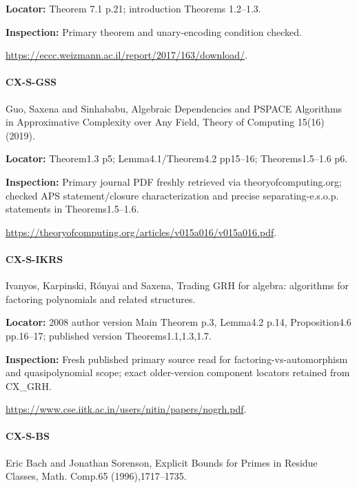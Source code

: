 \documentclass[11pt,a4paper]{article}
\begin{document}
\textbf{Locator:} Theorem 7.\allowbreak{}1 p.\allowbreak{}21; introduction Theorems 1.\allowbreak{}2–\allowbreak{}1.\allowbreak{}3.

\textbf{Inspection:} Primary theorem and unary-encoding condition checked.\allowbreak{}

\url{https://eccc.weizmann.ac.il/report/2017/163/download/}.

\paragraph{CX-S-GSS} Guo, Saxena and Sinhababu, Algebraic Dependencies and PSPACE Algorithms in Approximative Complexity over Any Field, Theory of Computing 15(16) (2019).

\textbf{Locator:} Theorem1.\allowbreak{}3 p5; Lemma4.\allowbreak{}1/\allowbreak{}Theorem4.\allowbreak{}2 pp15–\allowbreak{}16; Theorems1.\allowbreak{}5–\allowbreak{}1.\allowbreak{}6 p6.

\textbf{Inspection:} Primary journal PDF freshly retrieved via theoryofcomputing.\allowbreak{}org; checked APS statement/\allowbreak{}closure characterization and precise separating-e.\allowbreak{}s.\allowbreak{}o.\allowbreak{}p.\allowbreak{} statements in Theorems1.\allowbreak{}5–\allowbreak{}1.\allowbreak{}6.\allowbreak{}

\url{https://theoryofcomputing.org/articles/v015a016/v015a016.pdf}.

\paragraph{CX-S-IKRS} Ivanyos, Karpinski, Rónyai and Saxena, Trading GRH for algebra:\allowbreak{} algorithms for factoring polynomials and related structures.

\textbf{Locator:} 2008 author version Main Theorem p.\allowbreak{}3, Lemma4.\allowbreak{}2 p.\allowbreak{}14, Proposition4.\allowbreak{}6 pp.\allowbreak{}16–\allowbreak{}17; published version Theorems1.\allowbreak{}1,1.\allowbreak{}3,1.\allowbreak{}7.

\textbf{Inspection:} Fresh published primary source read for factoring-vs-automorphism and quasipolynomial scope; exact older-version component locators retained from CX\_\allowbreak{}GRH.\allowbreak{}

\url{https://www.cse.iitk.ac.in/users/nitin/papers/nogrh.pdf}.

\paragraph{CX-S-BS} Eric Bach and Jonathan Sorenson, Explicit Bounds for Primes in Residue Classes, Math.\allowbreak{} Comp.\allowbreak{}65 (1996),1717–\allowbreak{}1735.
\end{document}
